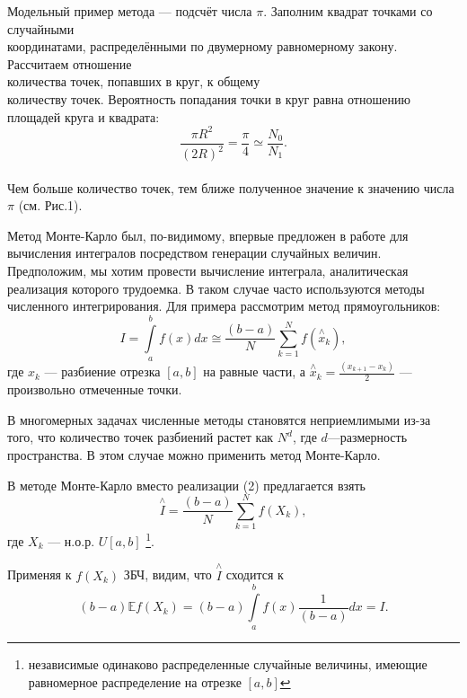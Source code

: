 \documentclass[14pt,a4paper]{article}
\begin{document}
Модельный пример метода --- подсчёт числа $\pi$. Заполним квадрат точками со случайными \\координатами, распределёнными по двумерному равномерному закону. Рассчитаем отношение \\количества точек, попавших в круг, к общему \\количеству точек. 
 Вероятность попадания точки в круг равна отношению площадей круга и квадрата:
\begin{equation}
 \frac{\pi R^2 }{(2R)^2} = \frac{\pi}{4} \simeq \frac{N_0}{N_1}.
\end{equation}
\\Чем больше количество точек, тем ближе полученное значение к значению числа $\pi$ (см. Рис.1). 
	\[\]\[\]	\[\]

Метод Монте-Карло был, по-видимому, впервые предложен в работе \cite{phys} для вычисления интегралов посредством генерации случайных величин. Предположим, мы хотим провести вычисление интеграла, аналитическая реализация которого трудоемка. В таком случае часто используются методы численного интегрирования. Для примера рассмотрим метод прямоугольников:
\begin{equation}
I = \int\limits_a^b f(x) dx \cong \frac{(b-a)}{N}  \sum_{k=1}^{N}f(\overset{\wedge}{x}_{k}),    
\end{equation}
где ${x}_{k}$ --- разбиение отрезка $[a,b]$ на равные части, а $\overset{\wedge}{x}_{k} = \frac{(x_{k+1} - x_k)}{2}$ --- произвольно отмеченные точки.

В многомерных задачах численные методы становятся неприемлимыми из-за того, что количество точек разбиений растет как $N^d$, где $d$---размерность пространства. В этом случае можно применить метод Монте-Карло.

В методе Монте-Карло вместо реализации (2) предлагается взять 
\begin{equation}
    \overset{\wedge}I = \frac{(b-a)}{N}  \sum_{k=1}^{N}f({X}_{k}),
\end{equation}
где $X_k$ --- н.о.р. $U[a,b]$ \footnote{независимые одинаково распределенные случайные величины, имеющие равномерное распределение на отрезке $[a,b]$}.

Применяя к $f(X_k)$ ЗБЧ, видим, что $\overset{\wedge}I$ сходится к 
\begin{equation}
    (b-a)\mathbb{E} f({X}_{k}) = (b-a)\int\limits_a^b f(x)\frac{1}{(b-a)} dx = I.
\end{equation}
\end{document}
